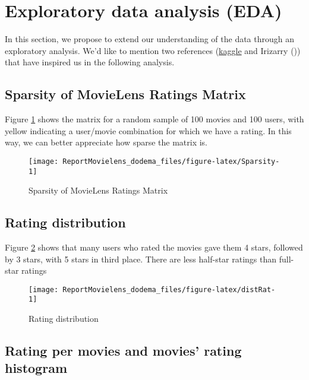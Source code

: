 \documentclass[
]{article}
\begin{document}
\section{Exploratory data analysis (EDA)}\label{exploratory-data-analysis-eda}

In this section, we propose to extend our understanding of the data through an exploratory analysis. We'd like to mention two references (\href{https://www.kaggle.com/code/amirmotefaker/movie-recommendation-system-using-r-best}{kaggle} and Irizarry ()) that have inspired us in the following analysis.

\subsection{Sparsity of MovieLens Ratings Matrix}\label{sparsity-of-movielens-ratings-matrix}

Figure \ref{fig:Sparsity} shows the matrix for a random sample of 100 movies and 100 users, with yellow indicating a user/movie combination for which we have a rating. In this way, we can better appreciate how sparse the matrix is.

\begin{figure}[H]
\texttt{[image: ReportMovielens\_dodema\_files/figure-latex/Sparsity-1]} \caption{Sparsity of MovieLens Ratings Matrix}\label{fig:Sparsity}
\end{figure}

\subsection{Rating distribution}\label{rating-distribution}

Figure \ref{fig:distRat} shows that many users who rated the movies gave them 4 stars, followed by 3 stars, with 5 stars in third place. There are less half-star ratings than full-star ratings

\begin{figure}[H]

{\centering \texttt{[image: ReportMovielens\_dodema\_files/figure-latex/distRat-1]} 

}

\caption{Rating distribution}\label{fig:distRat}
\end{figure}

\subsection{Rating per movies and movies' rating histogram}\label{rating-per-movies-and-movies-rating-histogram}
\end{document}
